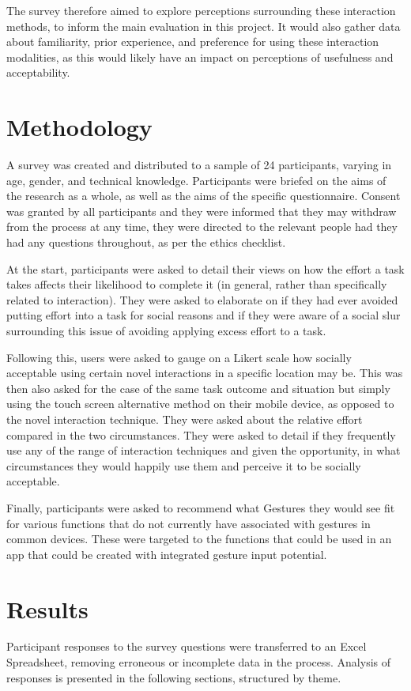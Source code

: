 \documentclass{l4proj}
\begin{document}
The survey therefore aimed to explore perceptions surrounding these interaction methods, to inform the main evaluation in this project. It would also gather data about familiarity, prior experience, and preference for using these interaction modalities, as this would likely have an impact on perceptions of usefulness and acceptability.

\section{Methodology}

A survey was created and distributed to a sample of 24 participants, varying in age, gender, and technical knowledge. Participants were briefed on the aims of the research as a whole, as well as the aims of the specific questionnaire. Consent was granted by all participants and they were informed that they may withdraw from the process at any time, they were directed to the relevant people had they had any questions throughout, as per the ethics checklist. 

At the start, participants were asked to detail their views on how the effort a task takes affects their likelihood to complete it (in general, rather than specifically related to interaction). They were asked to elaborate on if they had ever avoided putting effort into a task for social reasons and if they were aware of a social slur surrounding this issue of avoiding applying excess effort to a task.

Following this, users were asked to gauge on a Likert scale how socially acceptable using certain novel interactions in a specific location may be. This was then also asked for the case of the same task outcome and situation but simply using the touch screen alternative method on their mobile device, as opposed to the novel interaction technique. They were asked about the relative effort compared in the two circumstances. They were asked to detail if they frequently use any of the range of interaction techniques and given the opportunity, in what circumstances they would happily use them and perceive it to be socially acceptable.

Finally, participants were asked to recommend what Gestures they would see fit for various functions that do not currently have associated with gestures in common devices. These were targeted to the functions that could be used in an app that could be created with integrated gesture input potential.

\section{Results}
Participant responses to the survey questions were transferred to an Excel Spreadsheet, removing erroneous or incomplete data in the process. Analysis of responses is presented in the following sections, structured by theme.
\end{document}
